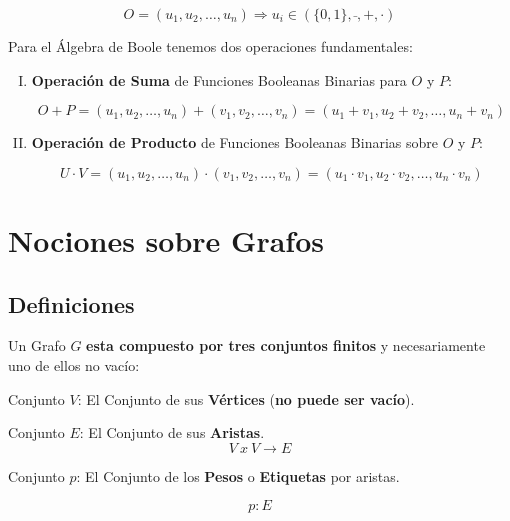 \begin{equation}
O = (u_1,u_2,\ldots,u_n) \Rightarrow u_i \in (\{0,1\}, \bar{ }, +, \cdot)
\end{equation}

Para el Álgebra de Boole tenemos dos operaciones fundamentales:

\begin{enumerate}[I.]

\item \textbf{Operación de Suma} de Funciones Booleanas Binarias para $O$ y $P$:

\begin{equation}
O + P = (u_1,u_2,\ldots,u_n) + (v_1,v_2,\ldots,v_n) = (u_1 + v_1,u_2 + 
v_2,\ldots,u_n + v_n)
\end{equation}

\item \textbf{Operación de Producto} de Funciones Booleanas Binarias sobre $O$ 
y 
$P$:

\begin{equation}
U \cdot V = (u_1,u_2,\ldots,u_n) \cdot (v_1,v_2,\ldots,v_n) = (u_1 \cdot 
v_1,u_2 
\cdot v_2,\ldots,u_n \cdot v_n)
\end{equation}

\end{enumerate}


\section{Nociones sobre Grafos}

\subsection{Definiciones}
 Un Grafo $G$ \textbf{esta compuesto por tres conjuntos finitos} y 
necesariamente 
uno de ellos no vacío:

\begin{enumerate}[i.]
\item Conjunto $V$: El Conjunto de sus \textbf{Vértices} (\textbf{no puede ser 
vacío}).
{
\item Conjunto $E$: El Conjunto de sus \textbf{Aristas}.
\begin{equation}
V\ x\ V \rightarrow E
\end{equation}
}
{
\item Conjunto $p$: El Conjunto de los \textbf{Pesos} o \textbf{Etiquetas} por 
aristas.

\begin{equation}
p:E
\end{equation}
}

\end{enumerate}

